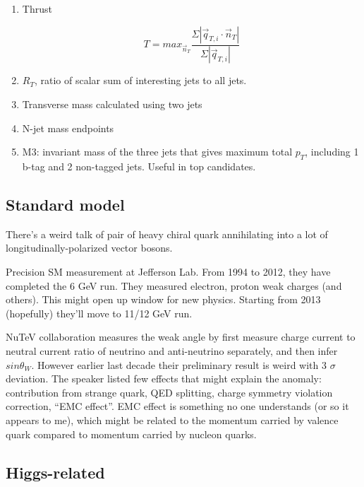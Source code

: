 \documentclass{fheadnote}
\begin{document}
\begin{enumerate}
\item Thrust

\begin{equation}
T = max_{\vec{n}_T} \dfrac{\Sigma |\vec{q}_{T,i} \cdot \vec{n}_T|}{\Sigma |\vec{q}_{T,i}|}  \nonumber
\end{equation}

\item $R_T$, ratio of scalar sum of interesting jets to all jets.

\item Transverse mass calculated using two jets

\item N-jet mass endpoints

\item M3: invariant mass of the three jets that gives maximum total $p_T$, including 1 b-tag and 2 non-tagged
jets.  Useful in top candidates.

\end{enumerate}

\subsection{Standard model}

There's a weird talk of pair of heavy chiral quark annihilating into a lot of longitudinally-polarized
vector bosons.

Precision SM measurement at Jefferson Lab.  From 1994 to 2012, they have completed the 6 GeV run.
They measured electron, proton weak charges (and others).  This might open up window for new physics.
Starting from 2013 (hopefully) they'll move to 11/12 GeV run.

NuTeV collaboration measures the weak angle by first measure charge current to neutral current ratio
of neutrino and anti-neutrino separately, and then infer $sin \theta_W$.
However earlier last decade their preliminary result is weird with 3 $\sigma$ deviation.
The speaker listed few effects that might explain the anomaly: contribution from strange quark,
QED splitting, charge symmetry violation correction, ``EMC effect''.
EMC effect is something no one understands (or so it appears to me), which might be related to
the momentum carried by valence quark compared to momentum carried by nucleon quarks.

\subsection{Higgs-related}
\end{document}
